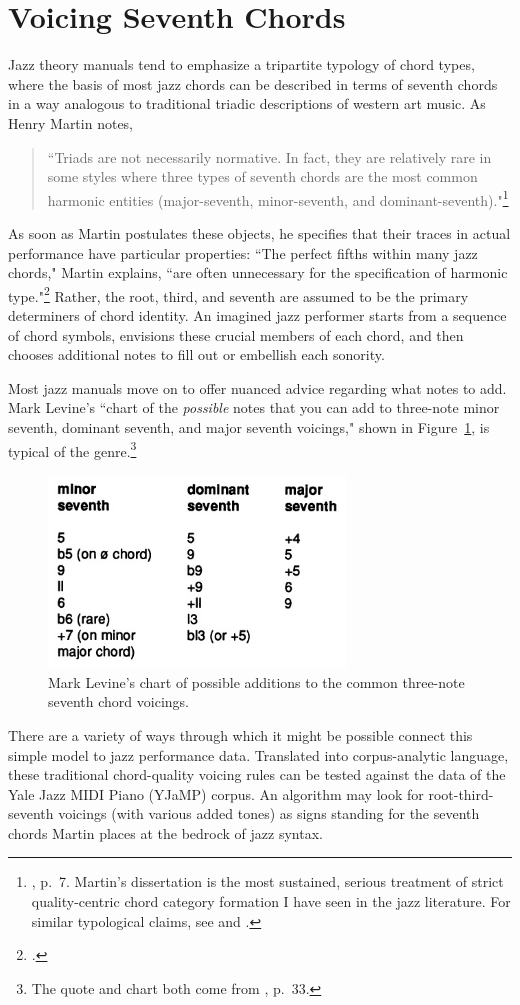 \section{Voicing Seventh Chords}
Jazz theory manuals tend to emphasize a tripartite typology of chord types, where the basis of most jazz chords can be described in terms of seventh chords in a way analogous to traditional triadic descriptions of western art music.  As Henry Martin notes,
\begin{quote}
``Triads are not necessarily normative.  In fact, they are relatively rare in some styles where three types of seventh chords are the most common harmonic entities (major-seventh, minor-seventh, and dominant-seventh)."\footnote{\cite{martin1980}, p.\ 7.  Martin's dissertation is the most sustained, serious treatment of strict quality-centric chord category formation I have seen in the jazz literature.  For similar typological claims, see \cite{mehegan1959} and \cite{levine1989}.}
\end{quote}
As soon as Martin postulates these objects, he specifies that their traces in actual performance have particular properties: ``The perfect fifths within many jazz chords," Martin explains, ``are often unnecessary for the specification of harmonic type."\footnote{\cite{martin1980}.}  Rather, the root, third, and seventh are assumed to be the primary determiners of chord identity.  An imagined jazz performer starts from a sequence of chord symbols, envisions these crucial members of each chord, and then chooses additional notes to fill out or embellish each sonority.

Most jazz manuals move on to offer nuanced advice regarding what notes to add.  Mark Levine's ``chart of the \emph{possible} notes that you can add to three-note minor seventh, dominant seventh, and major seventh voicings," shown in Figure~\ref{levineextensions}, is typical of the genre.\footnote{The quote and chart both come from \cite{levine1989}, p.\ 33.}
\begin{figure}
	\caption{Mark Levine's chart of possible additions to the common three-note seventh chord voicings.}
	\label{levineextensions}
	\centering
	\includegraphics[width=3.1in]{levineextensions.jpg}
\end{figure}
There are a variety of ways through which it might be possible connect this simple model to jazz performance data.  Translated into corpus-analytic language, these traditional chord-quality voicing rules can be tested against the data of the Yale Jazz MIDI Piano (YJaMP) corpus.  An algorithm may look for root-third-seventh voicings (with various added tones) as signs standing for the seventh chords Martin places at the bedrock of jazz syntax.

